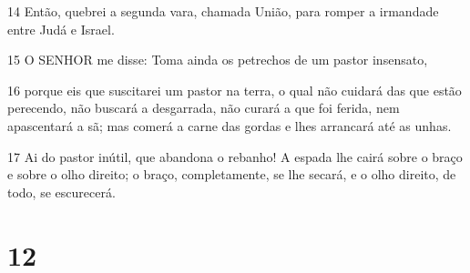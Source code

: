 \par 14 Então, quebrei a segunda vara, chamada União, para romper a irmandade entre Judá e Israel.
\par 15 O SENHOR me disse: Toma ainda os petrechos de um pastor insensato,
\par 16 porque eis que suscitarei um pastor na terra, o qual não cuidará das que estão perecendo, não buscará a desgarrada, não curará a que foi ferida, nem apascentará a sã; mas comerá a carne das gordas e lhes arrancará até as unhas.
\par 17 Ai do pastor inútil, que abandona o rebanho! A espada lhe cairá sobre o braço e sobre o olho direito; o braço, completamente, se lhe secará, e o olho direito, de todo, se escurecerá.

\chapter{12}

